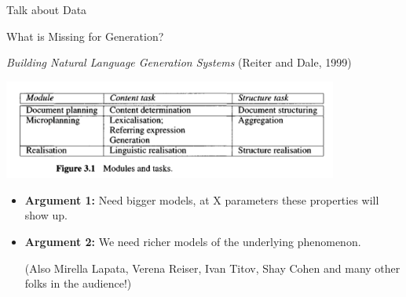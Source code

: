 \begin{frame}{Talk about Data }
\begin{center}
  \end{center}
\end{frame}


\begin{frame}{ What is Missing for  Generation? }

    \textit{Building Natural Language Generation Systems} (Reiter and Dale, 1999)

\vspace*{-0.5cm}
 \begin{center}
    \includegraphics[width =11cm]{datadoc}
  \end{center}
  \vspace*{-0.5cm}


  \begin{itemize}
  \item \textbf{Argument 1:} Need bigger models, at  X parameters these
    properties will show up.
    \air
  \item \textbf{Argument 2:} We need richer models of the underlying phenomenon.

    \air
    (Also Mirella Lapata, Verena Reiser, Ivan Titov, Shay Cohen
    and many other folks in the audience!)
  \end{itemize}
\end{frame}




